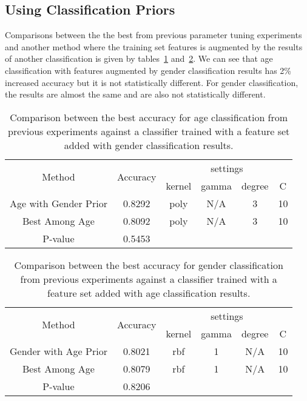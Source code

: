 \documentclass[a4paper]{llncs}
\begin{document}
\subsection{Using Classification Priors}
Comparisons between the the best from previous parameter tuning experiments and another method where the training set features is augmented by the results of another classification is given by tables~\ref{table:AgeWithPriors} and~\ref{table:GenderWithPriors}. We can see that age classification with features augmented by gender classification results has 2\% increased accuracy but it is not statistically different. For gender classification, the results are almost the same and are also not statistically different. 
\begin{table}[!htbp]
\centering
\begin{tabular}{|c|c|c|c|c|c|}
\hline
\multirow{2}{*}{Method} & \multirow{2}{*}{Accuracy} & \multicolumn{4}{c|}{settings}   \\ \cline{3-6} 
                        &                           & kernel & gamma    & degree & C  \\ \hline
Age with Gender Prior   & 0.8292                    & poly   & N/A      & 3      & 10 \\ \hline
Best Among Age          & 0.8092                    & poly   & N/A &    3    &  10   \\ \hline
P-value                 & 0.5453                    &        &          &        &    \\ \hline
\end{tabular}
\caption{Comparison between the best accuracy for age classification from previous experiments against a classifier trained with a feature set added with gender classification results.}
\label{table:AgeWithPriors}
\end{table}

\begin{table}[!htbp]
\centering
\begin{tabular}{|c|c|c|c|c|c|}
\hline
\multirow{2}{*}{Method} & \multirow{2}{*}{Accuracy} & \multicolumn{4}{c|}{settings} \\ \cline{3-6} 
                        &                           & kernel  & gamma & degree & C  \\ \hline
Gender with Age Prior   & 0.8021                    & rbf     & 1     & N/A    & 10 \\ \hline
Best Among Age          & 0.8079                    & rbf     & 1     & N/A    & 10 \\ \hline
P-value                 & 0.8206                    &         &       &        &    \\ \hline
\end{tabular}
\caption{Comparison between the best accuracy for gender classification from previous experiments against a classifier trained with a feature set added with age classification results.}
\label{table:GenderWithPriors}
\end{table}
\end{document}
